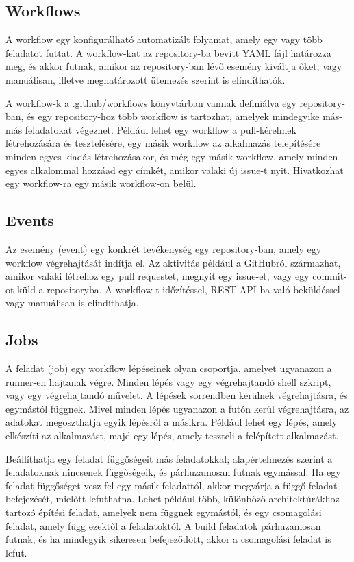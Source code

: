 \subsection{Workflows}
A workflow egy konfigurálható automatizált folyamat, amely egy vagy több feladatot futtat. A workflow-kat az repository-ba bevitt YAML fájl határozza meg, és akkor futnak, amikor az repository-ban lévő esemény kiváltja őket, vagy manuálisan, illetve meghatározott ütemezés szerint is elindíthatók.

A workflow-k a .github/workflows könyvtárban vannak definiálva egy repository-ban, és egy repository-hoz több workflow is tartozhat, amelyek mindegyike más-más feladatokat végezhet. Például lehet egy workflow a pull-kérelmek létrehozására és tesztelésére, egy másik workflow az alkalmazás telepítésére minden egyes kiadás létrehozásakor, és még egy másik workflow, amely minden egyes alkalommal hozzáad egy címkét, amikor valaki új issue-t nyit. Hivatkozhat egy workflow-ra egy másik workflow-on belül.
\cite{github}

\subsection{Events}
Az esemény (event) egy konkrét tevékenység egy repository-ban, amely egy workflow végrehajtását indítja el. Az aktivitás például a GitHubról származhat, amikor valaki létrehoz egy pull requestet, megnyit egy issue-et, vagy egy commit-ot küld a repositoryba. A workflow-t időzítéssel, REST API-ba való beküldéssel vagy manuálisan is elindíthatja.
\cite{github}

\subsection{Jobs}
A feladat (job) egy workflow lépéseinek olyan csoportja, amelyet ugyanazon a runner-en hajtanak végre. Minden lépés vagy egy végrehajtandó shell szkript, vagy egy végrehajtandó művelet. A lépések sorrendben kerülnek végrehajtásra, és egymástól függnek. Mivel minden lépés ugyanazon a futón kerül végrehajtásra, az adatokat megoszthatja egyik lépésről a másikra. Például lehet egy lépés, amely elkészíti az alkalmazást, majd egy lépés, amely teszteli a felépített alkalmazást.

Beállíthatja egy feladat függőségeit más feladatokkal; alapértelmezés szerint a feladatoknak nincsenek függőségeik, és párhuzamosan futnak egymással. Ha egy feladat függőséget vesz fel egy másik feladattól, akkor megvárja a függő feladat befejezését, mielőtt lefuthatna. Lehet például több, különböző architektúrákhoz tartozó építési feladat, amelyek nem függnek egymástól, és egy csomagolási feladat, amely függ ezektől a feladatoktól. A build feladatok párhuzamosan futnak, és ha mindegyik sikeresen befejeződött, akkor a csomagolási feladat is lefut.
\cite{github}

